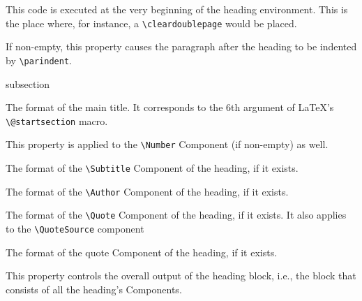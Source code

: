 
This code is executed at the very beginning of the heading
environment. This is the place where, for instance, a
\lstinline{\cleardoublepage} would be placed.



If non-empty, this property causes the paragraph after the heading to
be indented by \lstinline{\parindent}.


\begin{Heading}[label=sec:hdg:props:format]{subsection}
\end{Heading}


The format of the main title. It corresponds to the 6th argument of
\LaTeX's \lstinline{\@startsection} macro.

This property is applied to the \lstinline{\Number} Component (if
non-empty) as well.


The format of the \lstinline{\Subtitle} Component of the heading, if it exists.


The format of the \lstinline{\Author} Component of the heading, if it exists.


The format of the \lstinline{\Quote} Component of the heading, if it exists. It
also applies to the \lstinline{\QuoteSource} component


The format of the quote Component of the heading, if it exists.\Hack{\newpage}


This property controls the overall output of the heading block, i.e.,
the block that consists of all the heading's Components.

